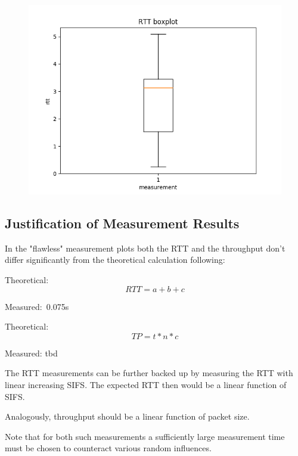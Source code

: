\documentclass{article}
\begin{document}
\begin{figure}[h] \label{usrp-fails2-5}
	\includegraphics[width=\textwidth]{usrp_fail2_rtt_boxplot}
\end{figure} 

\clearpage

\subsection{Justification of Measurement Results}

In the "flawless" measurement plots both the RTT and the throughput don't differ significantly from the theoretical calculation following:

Theoretical:
\begin{equation*}
	RTT = a + b+ c
\end{equation*} 

Measured:~0.075s 

\bigskip

Theoretical:
\begin{equation*}
	TP = t*n*c
\end{equation*}

Measured: tbd

\bigskip

The RTT measurements can be further backed up by measuring the RTT with linear increasing SIFS. The expected RTT then would be a linear function of SIFS.

\bigskip

Analogously, throughput should be a linear function of packet size. 

\bigskip

Note that for both such measurements a sufficiently large measurement time must be chosen to counteract various random influences.
\end{document}
